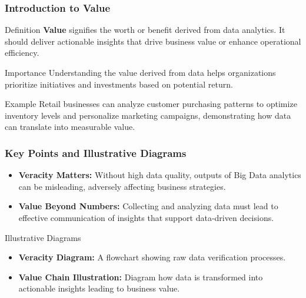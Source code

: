 \documentclass[aspectratio=169]{beamer}
\begin{document}
\begin{frame}[fragile]
    \frametitle{Introduction to Value}
    \begin{block}{Definition}
        \textbf{Value} signifies the worth or benefit derived from data analytics. It should deliver actionable insights that drive business value or enhance operational efficiency.
    \end{block}
    
    \begin{block}{Importance}
        Understanding the value derived from data helps organizations prioritize initiatives and investments based on potential return.
    \end{block}
    
    \begin{block}{Example}
        Retail businesses can analyze customer purchasing patterns to optimize inventory levels and personalize marketing campaigns, demonstrating how data can translate into measurable value.
    \end{block}
\end{frame}

\begin{frame}[fragile]
    \frametitle{Key Points and Illustrative Diagrams}
    \begin{itemize}
        \item \textbf{Veracity Matters:} Without high data quality, outputs of Big Data analytics can be misleading, adversely affecting business strategies.
        \item \textbf{Value Beyond Numbers:} Collecting and analyzing data must lead to effective communication of insights that support data-driven decisions.
    \end{itemize}
    
    \begin{block}{Illustrative Diagrams}
        \begin{itemize}
            \item \textbf{Veracity Diagram:} A flowchart showing raw data verification processes.
            \item \textbf{Value Chain Illustration:} Diagram how data is transformed into actionable insights leading to business value.
        \end{itemize}
    \end{block}
\end{frame}
\end{document}
